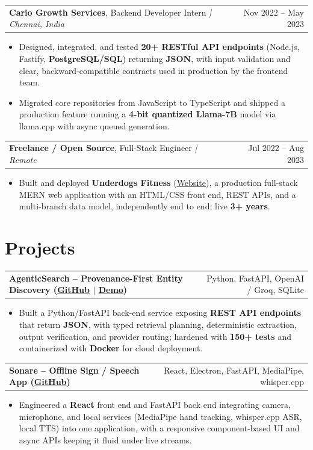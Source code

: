 \documentclass[letterpaper,11pt]{article}
\makeatletter
\newcommand{\expItem}[4]{%
  \vspace{3pt}
  \begin{tabular*}{\textwidth}{@{}l@{\extracolsep{\fill}}r@{}}
    \textbf{#1}, #2 \textit{| #3} & #4 \\
  \end{tabular*}\par\vspace{-2pt}
}
\newcommand{\projItem}[2]{%
  \vspace{6pt}
  \begin{tabular*}{\textwidth}{@{}l@{\extracolsep{\fill}}r@{}}
    \textbf{#1} & #2 \\
  \end{tabular*}\par\vspace{-2pt}
}
\makeatother
\begin{document}
\expItem{Cario Growth Services}{Backend Developer Intern}{Chennai, India}{Nov 2022 -- May 2023}
\begin{itemize}
  \item Designed, integrated, and tested \textbf{20+ RESTful API endpoints} (Node.js, Fastify, \textbf{PostgreSQL/SQL}) returning \textbf{JSON}, with input validation and clear, backward-compatible contracts used in production by the frontend team.
  \item Migrated core repositories from JavaScript to TypeScript and shipped a production feature running a \textbf{4-bit quantized Llama-7B} model via llama.cpp with async queued generation.
\end{itemize}

\expItem{Freelance / Open Source}{Full-Stack Engineer}{Remote}{Jul 2022 -- Aug 2023}
\begin{itemize}
  \item Built and deployed \textbf{Underdogs Fitness} (\href{https://www.underdogsfitness.in/}{Website}), a production full-stack MERN web application with an HTML/CSS front end, REST APIs, and a multi-branch data model, independently end to end; live \textbf{3+ years}.
\end{itemize}

\section{Projects}

\projItem{AgenticSearch -- Provenance-First Entity Discovery {\normalfont\small(\href{https://github.com/Deva-1903/ciir_agentic_search}{GitHub} $\vert$ \href{https://agentic-search-negglszkwa-uc.a.run.app}{Demo})}}{Python, FastAPI, OpenAI / Groq, SQLite}
\begin{itemize}
  \item Built a Python/FastAPI back-end service exposing \textbf{REST API endpoints} that return \textbf{JSON}, with typed retrieval planning, deterministic extraction, output verification, and provider routing; hardened with \textbf{150+ tests} and containerized with \textbf{Docker} for cloud deployment.
\end{itemize}

\projItem{Sonare -- Offline Sign / Speech App {\normalfont\small(\href{https://github.com/Deva-1903/Qualcomm-Sep25-Team-Sonare}{GitHub})}}{React, Electron, FastAPI, MediaPipe, whisper.cpp}
\begin{itemize}
  \item Engineered a \textbf{React} front end and FastAPI back end integrating camera, microphone, and local services (MediaPipe hand tracking, whisper.cpp ASR, local TTS) into one application, with a responsive component-based UI and async APIs keeping it fluid under live streams.
\end{itemize}
\end{document}

